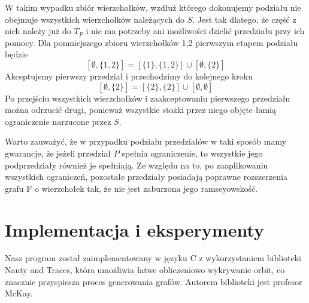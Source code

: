 \documentclass[11pt]{article}
\begin{document}
W takim wypadku zbiór wierzchołków, wzdłuż którego dokonujemy podziału nie obejmuje wszystkich wierzchołków należących do $S$. Jest tak dlatego, że część z nich należy już do $T_P$ i nie ma potrzeby ani możliwości dzielić przedziału przy ich pomocy. Dla pomniejszego zbioru wierzchołków {1,2} pierwszym etapem podziału będzie 
$$[{\emptyset},\{1,2\}]= [\{1\},\{1,2\}] \cup [{\emptyset},\{2\}]$$ Akceptujemy pierwszy przedział i przechodzimy do kolejnego kroku
$$ [{\emptyset},\{2\}]= [\{2\},\{2\}] \cup [{\emptyset},{\emptyset}]$$ Po przejściu wszystkich wierzchołków i zaakceptowaniu pierwszego przedziału można odrzucić drugi, ponieważ wszystkie stożki przez niego objęte łamią ograniczenie narzucone przez $S$.

Warto zauważyć, że w przypadku podziału przedziałów w taki sposób mamy gwarancje, że jeżeli przedział $P$ spełnia ograniczenie, to wszystkie jego podprzedziały również je spełniają. Ze względu na to, po zaaplikowaniu wszystkich ograniczeń, pozostałe przedziały posiadają poprawne rozszerzenia grafu F o wierzchołek tak, że nie jest zaburzona jego ramseyowskość. 



\section{Implementacja i eksperymenty}
Nasz program został zaimplementowany w języku C z wykorzystaniem biblioteki Nauty and Traces\cite{nauty}, która umożliwia łatwe obliczeniowo wykrywanie orbit, co znacznie przyspiesza proces generowania grafów. 
Autorem biblioteki jest profesor McKay. 
\end{document}
